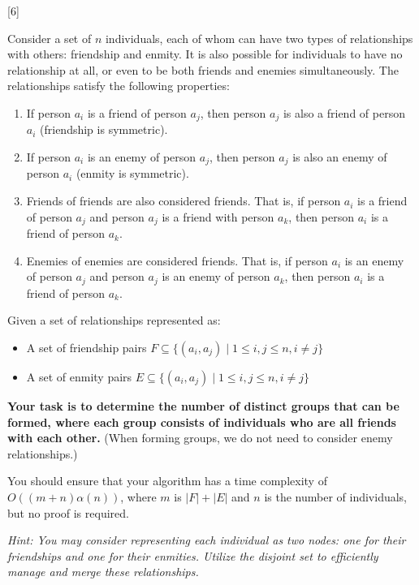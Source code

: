 [6]
\raggedright
Consider a set of \( n \) individuals, each of whom can have two types of relationships with others: friendship and enmity. It is also possible for individuals to have no relationship at all, or even to be both friends and enemies simultaneously. The relationships satisfy the following properties:

\begin{enumerate}
    \item If person \( a_i \) is a friend of person \( a_j \), then person \( a_j \) is also a friend of person \( a_i \) (friendship is symmetric).
    \item If person \( a_i \) is an enemy of person \( a_j \), then person \( a_j \) is also an enemy of person \( a_i \) (enmity is symmetric).
    \item Friends of friends are also considered friends. That is, if person \( a_i \) is a friend of person \( a_j \) and person \( a_j \) is a friend with person \( a_k \), then person \( a_i \) is a friend of person \( a_k \).
    \item Enemies of enemies are considered friends. That is, if person \( a_i \) is an enemy of person \( a_j \) and person \( a_j \) is an enemy of person \( a_k \), then person \( a_i \) is a friend of person \( a_k \).
\end{enumerate}

Given a set of relationships represented as:

\begin{itemize}
    \item A set of friendship pairs \( F \subseteq \{(a_i, a_j) \mid 1 \leq i, j \leq n, i \neq j\} \)
    \item A set of enmity pairs \( E \subseteq \{(a_i, a_j) \mid 1 \leq i, j \leq n, i \neq j\} \)
\end{itemize}

\textbf{Your task is to determine the number of distinct groups that can be formed, where each group consists of individuals who are all friends with each other.} (When forming groups, we do not need to consider enemy relationships.)

You should ensure that your algorithm has a time complexity of $O((m+n)\alpha(n))$, where $m$ is $|F|+|E|$ and $n$ is the number of individuals, but no proof is required.

\textit{Hint: You may consider representing each individual as two nodes: one for their friendships and one for their enmities. Utilize the disjoint set to efficiently manage and merge these relationships.}

\raggedright
\begin{solution}
\vspace{150pt}

\end{solution}